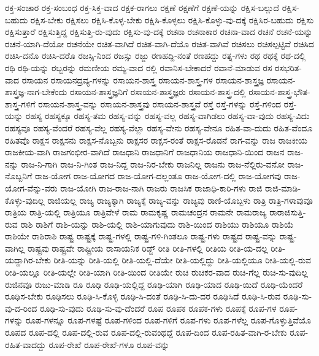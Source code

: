 {ರಕ್ತ-ಸಂಚಾರ
ರಕ್ತ-ಸಂಬಂಧ
ರಕ್ತ-ಸಿಕ್ತ-ವಾದ
ರಕ್ಷಕ-ರಾಗಲು
ರಕ್ಷಣೆ
ರಕ್ಷಣೆಗೆ
ರಕ್ಷಣೆ-ಯನ್ನು
ರಕ್ಷಿಸ-ಬಲ್ಲುದೆ
ರಕ್ಷಿಸ-ಬಹುದು
ರಕ್ಷಿಸ-ಬೇಕು
ರಕ್ಷಿಸಲು
ರಕ್ಷಿಸಿ-ಕೊಳ್ಳ-ಬೇಕು
ರಕ್ಷಿಸಿ-ಕೊಳ್ಳಲು
ರಕ್ಷಿಸಿ-ಕೊಳ್ಳು-ವು-ದಕ್ಕೆ
ರಕ್ಷಿಸಿರ-ಬಹುದು
ರಕ್ಷಿಸು
ರಕ್ಷಿಸುತ್ತಾರೆ
ರಕ್ಷಿಸುತ್ತಿದ್ದ
ರಕ್ಷಿಸುತ್ತಿ-ರು-ವುದು
ರಕ್ಷಿಸು-ವು-ದಕ್ಕೆ
ರಚನಾ
ರಚನಾಕಾರ
ರಚನಾ-ವಾದ
ರಚನೆ
ರಚನೆ-ಯನ್ನು
ರಚನೆ-ಯಾಗಿ-ದೆಯೋ
ರಚನೆಯೇ
ರಚಿತ-ವಾಗಿದೆ
ರಚಿತ-ವಾಗಿ-ದೆಯೊ
ರಚಿತ-ವಾಗಿವೆ
ರಚಿಸಲು
ರಚಿಸಲ್ಪಟ್ಟಿವೆ
ರಚಿಸಿದ
ರಚಿಸಿ-ದನೊ
ರಚಿಸಿ-ದರೊ
ರಜಸ್ಸಿ-ನಿಂದ
ರಜಸ್ಸು
ರಜ್ಜು
ರಣಹದ್ದಿ-ನಂತೆ
ರಣಹದ್ದು
ರತ್ನ-ಗಳು
ರಥ
ರಥಕ್ಕೆ
ರಥ-ದಲ್ಲಿ
ರಥಿ
ರಥಿ-ಯನ್ನು
ರಬ್ಬರನ್ನು
ರಮಣೀಯ
ರಮ್ಯ-ವಾದ
ರಲ್ಲಿ
ರವಾನಿಸ-ಬೇಕಾದರೆ
ರವಾನೆ-ಮಾಡುವ
ರಸ
ರಸಭರಿತ-ವಾದ
ರಸಾಯನ
ರಸಾಯನದ್ರವ್ಯ-ಗಳನ್ನು
ರಸಾಯನ-ಶಾಸ್ತ್ರ
ರಸಾಯನ-ಶಾಸ್ತ್ರ-ಗಳ
ರಸಾಯನ-ಶಾಸ್ತ್ರಜ್ಞ
ರಸಾಯನ-ಶಾಸ್ತ್ರಜ್ಞ-ನಾಗ-ಬೇಕೆಂದು
ರಸಾಯನ-ಶಾಸ್ತ್ರಜ್ಞನಿಗೆ
ರಸಾಯನ-ಶಾಸ್ತ್ರಜ್ಞರು
ರಸಾಯನ-ಶಾಸ್ತ್ರ-ದಲ್ಲಿ
ರಸಾಯನ-ಶಾಸ್ತ್ರ-ಭೌತ-ಶಾಸ್ತ್ರ-ಗಳಿಗೆ
ರಸಾಯನ-ಶಾಸ್ತ್ರ-ವನ್ನು
ರಸಾಯನ-ಶಾಸ್ತ್ರವು
ರಸಾಯನ-ಶಾಸ್ತ್ರವೆ
ರಸ್ತೆ
ರಸ್ತೆ-ಗಳನ್ನು
ರಸ್ತೆ-ಗಳಿಂದ
ರಸ್ತೆ-ಯನ್ನು
ರಹಸ್ಯ
ರಹಸ್ಯಕ್ಕೂ
ರಹಸ್ಯ-ತಮ
ರಹಸ್ಯ-ವನ್ನು
ರಹಸ್ಯ-ವಲ್ಲ
ರಹಸ್ಯ-ವಾಗಿಡಲು
ರಹಸ್ಯ-ವಾ-ವುದು
ರಹಸ್ಯ-ವಿದು
ರಹಸ್ಯವೂ
ರಹಸ್ಯ-ವೆಂದರೆ
ರಹಸ್ಯ-ವೆಲ್ಲ
ರಹಸ್ಯ-ವೆಲ್ಲಾ
ರಹಸ್ಯ-ವೇನು
ರಹಸ್ಯ-ವೇನೂ
ರಹಿತ-ವಾ-ದುದು
ರಹಿತ-ವೆಂದೂ
ರಹಿತವೊ
ರಾಕ್ಷಸ
ರಾಕ್ಷಸನು
ರಾಕ್ಷಸ-ನೊಬ್ಬನು
ರಾಕ್ಷಸರ
ರಾಕ್ಷಸ-ರಂತೆ
ರಾಕ್ಷಸ-ರೊಡನೆ
ರಾಗ-ವನ್ನು
ರಾಜ
ರಾಜಕೀಯ
ರಾಜಕೀಯ-ವಾಗಿ
ರಾಜಗಂಭೀರ-ವಾಗಿದೆ
ರಾಜಧಾನಿ
ರಾಜಧಾನಿಗೆ
ರಾಜಧಾನಿಯ
ರಾಜಧಾನಿ-ಯಿಂದ
ರಾಜನ
ರಾಜ-ನನ್ನು
ರಾಜ-ನಿ-ಗಾಗಿ
ರಾಜ-ನಿ-ಗಿಂತ
ರಾಜ-ನಿದ್ದ
ರಾಜ-ನಿರ-ಬೇಕು
ರಾಜನಿಲ್ಲ
ರಾಜನು
ರಾಜ-ನೆಲ್ಲಿರು-ವನೋ
ರಾಜ-ನೊಬ್ಬನಿಗೆ
ರಾಜ-ಯೋಗ
ರಾಜ-ಯೋಗದ
ರಾಜ-ಯೋಗ-ದಲ್ಲಂತೂ
ರಾಜ-ಯೋಗ-ದಲ್ಲಿ
ರಾಜ-ಯೋಗವು
ರಾಜ-ಯೋಗ-ವೆನ್ನು-ವರು
ರಾಜ-ಯೋಗಿ
ರಾಜ-ರಾಜ-ನಾಗಿ
ರಾಜರು
ರಾಜಸಿಕ
ರಾಜಾಧಿ-ಕಾರಿ-ಗಳು
ರಾಜಿ
ರಾಜಿ-ಮಾಡಿ-ಕೊಳ್ಳು-ವುದಿಲ್ಲ
ರಾಜಿಯಲ್ಲ
ರಾಜ್ಯ
ರಾಜ್ಯಕ್ಕಾಗಿ
ರಾಜ್ಯಕ್ಕೆ
ರಾಜ್ಯ-ವನ್ನು
ರಾಜ್ಯವು
ರಾಣಿ-ಯೊಬ್ಬಳು
ರಾತ್ರಿ
ರಾತ್ರಿ-ಗಳಾವುವೂ
ರಾತ್ರಿಯ
ರಾತ್ರಿ-ಯಲ್ಲಿ
ರಾತ್ರಿಯೂ
ರಾತ್ರಿವೇಳೆ
ರಾಮ
ರಾಮಕೃಷ್ಣ
ರಾಮಚಂದ್ರನ
ರಾಮನೇ
ರಾಮರಾಜ್ಯ
ರಾರಾಜಿಸುತ್ತಿ-ರುವ
ರಾಶಿ
ರಾಶಿಗೆ
ರಾಶಿ-ಯನ್ನು
ರಾಶಿ-ಯಲ್ಲಿ
ರಾಶಿ-ಯಾಗುವುದು
ರಾಶಿ-ಯಿಂದ
ರಾಶಿಯು
ರಾಶಿಯೂ
ರಾಶಿಯೆ
ರಾಶಿಯೇ
ರಾಶಿರಾಶಿ
ರಾಷ್ಟ್ರ
ರಾಷ್ಟ್ರಕ್ಕೆ
ರಾಷ್ಟ್ರ-ಗಳಲ್ಲಿ
ರಾಷ್ಟ್ರ-ಗಳಿ-ಗಿಂತಲೂ
ರಾಷ್ಟ್ರ-ಗಳು
ರಾಷ್ಟ್ರದ
ರಾಷ್ಟ್ರ-ವನ್ನು
ರಾಷ್ಟ್ರ-ವಾಗಿಲ್ಲ
ರಾಷ್ಟ್ರವು
ರಾಷ್ಟ್ರವೇ
ರಾಷ್ಟ್ರೀಯ
ರಾಸಾಯನಿಕ
ರಿಡ್ಜ್
ರೀತಿ
ರೀತಿ-ಗಳಲ್ಲಿ
ರೀತಿಯ
ರೀತಿ-ಯ-ದಲ್ಲ
ರೀತಿ-ಯದ್ದಾಗಿರ-ಬೇಕು
ರೀತಿ-ಯನ್ನು
ರೀತಿ-ಯಲ್ಲಿ
ರೀತಿ-ಯಲ್ಲಿ-ದೆಯೇ
ರೀತಿ-ಯಲ್ಲಿದ್ದು
ರೀತಿ-ಯಲ್ಲಿಯೂ
ರೀತಿ-ಯಲ್ಲಿ-ರುವ
ರೀತಿ-ಯಲ್ಲೂ
ರೀತಿ-ಯಲ್ಲೇ
ರೀತಿ-ಯಾಗಿ
ರೀತಿ-ಯಿಂದ
ರೀತಿಯೇ
ರುಚಿ
ರುಚಿಕರ-ವಾದ
ರುಚಿ-ಗೆಲ್ಲ
ರುಚಿ-ಸು-ವುದಿಲ್ಲ
ರುಜಿನವೂ
ರುಜು-ಮಾಡಿ
ರೂ
ರೂಢಿ
ರೂಢಿ-ಯಲ್ಲಿದ್ದ
ರೂಢಿ-ಯಾಗಿ
ರೂಢಿ-ಯಾದ
ರೂಢಿ-ಯಿದೆ
ರೂಢಿ-ಯೆಂದರೆ
ರೂಢಿಸ-ಬೇಕು
ರೂಢಿಸಲು
ರೂಢಿ-ಸಿ-ಕೊಳ್ಳಿ
ರೂಢಿ-ಸಿ-ದಂತೆ
ರೂಢಿ-ಸಿ-ದು-ದರ
ರೂಢಿಸಿದೆ
ರೂಢಿ-ಸಿ-ರುವ
ರೂಢಿ-ಸು-ವು-ದ-ರಿಂದ
ರೂಢಿ-ಸು-ವುದು
ರೂಢಿ-ಸು-ವು-ದೆಂದರೆ
ರೂಪ
ರೂಪಕ
ರೂಪಕ-ಗಳು
ರೂಪಕ್ಕೆ
ರೂಪ-ಗಳ
ರೂಪ-ಗಳನ್ನು
ರೂಪ-ಗಳನ್ನೂ
ರೂಪ-ಗಳಷ್ಟೆ
ರೂಪ-ಗಳಿಂದ
ರೂಪ-ಗಳಿಗೆ
ರೂಪ-ಗಳು
ರೂಪ-ಗಳೆಲ್ಲ
ರೂಪ-ಗೊಳ್ಳುತ್ತಿವೆಯೊ
ರೂಪದ
ರೂಪ-ದಲ್ಲಿ
ರೂಪ-ದಲ್ಲಿ-ರುವ
ರೂಪ-ದಲ್ಲಿ-ರುವಂಥದ್ದೆ
ರೂಪ-ದಿಂದ
ರೂಪ-ರಹಿತ-ವಾಗಿ-ರ-ಬೇಕು
ರೂಪ-ರಹಿತ-ವಾದದ್ದು
ರೂಪ-ರೇಖೆ
ರೂಪ-ರೇಖೆ-ಗಳೂ
ರೂಪ-ವನ್ನು
}
